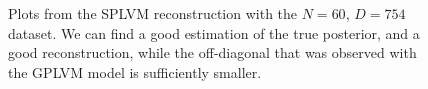 \begin{figure}
\begin{subfigure}[r]{0.3\textwidth}
	\end{subfigure}
	\caption[Y-$\hat{Y}$ pair plots for N=120 with the SPLVM model]{Plots from the SPLVM reconstruction with the $N=60$, $D=754$ dataset. We can find a good estimation of the true posterior, and a good reconstruction, while the off-diagonal that was observed with the GPLVM model is sufficiently smaller. }
	\label{fig:studt_N120_pairs}
\end{figure} 
